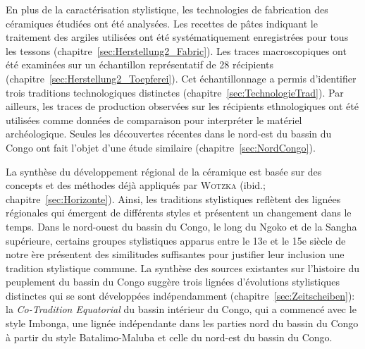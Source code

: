 \begin{multicols}{2}
En plus de la caractérisation stylistique, les technologies de fabrication des céramiques étudiées ont été analysées. Les recettes de pâtes indiquant le traitement des argiles utilisées ont été systématiquement enregistrées pour tous les tessons (chapitre~\ref{sec:Herstellung2_Fabric}). Les traces macroscopiques ont été examinées sur un échantillon représentatif de 28 récipients (chapitre~\ref{sec:Herstellung2_Toepferei}). Cet échantillonnage a permis d’identifier trois traditions technologiques distinctes (chapitre~\ref{sec:TechnologieTrad}). Par ailleurs, les traces de production observées sur les récipients ethnologiques ont été utilisées comme données de comparaison pour interpréter le matériel archéologique. Seules les découvertes récentes dans le nord-est du bassin du Congo ont fait l’objet d’une étude similaire (chapitre~\ref{sec:NordCongo}).

La synthèse du développement régional de la céramique est basée sur des concepts et des méthodes déjà appliqués par \textsc{Wotzka} (ibid.; chapitre~\ref{sec:Horizonte}). Ainsi,  les traditions stylistiques reflètent des lignées régionales qui émergent de différents styles et présentent un changement dans le temps. Dans le nord-ouest du bassin du Congo, le long du Ngoko et de la Sangha supérieure, certains groupes stylistiques apparus entre le 13e et le 15e siècle de notre ère présentent des similitudes suffisantes  pour justifier leur inclusion une tradition stylistique commune. La synthèse des sources existantes sur l'histoire du peuplement du bassin du Congo suggère trois lignées d’évolutions stylistiques distinctes qui se sont développées indépendamment (chapitre~\ref{sec:Zeitscheiben}): la \textit{Co-Tradition Equatorial} du bassin intérieur du Congo, qui a commencé avec le style Imbonga, une lignée indépendante dans les parties nord du bassin du Congo à partir du style Batalimo-Maluba et celle du nord-est du bassin du Congo.


\end{multicols}
